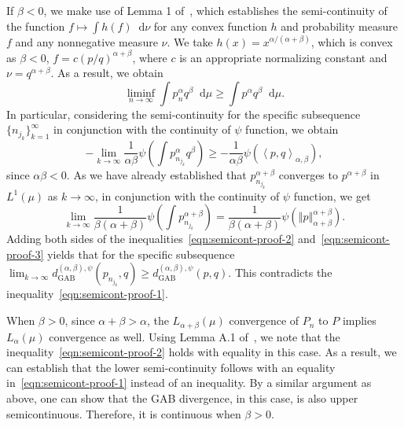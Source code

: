 \documentclass[11pt]{article}
\theoremstyle{plain}
\theoremstyle{remark}
\newcommand{\dd}{\mathop{}\!\mathrm{d}}
\newcommand{\dGAB}{d_{\mathrm{GAB}}}
\newcommand{\norm}[1]{\left\Vert #1 \right\Vert}
\newcommand{\inner}[1]{\left\langle #1\right\rangle}
\begin{document}
If $\beta < 0$, we make use of Lemma 1 of~\cite{teboulle1993convergence}, which establishes the semi-continuity of the function $f \mapsto \int h(f)\dd\nu$ for any convex function $h$ and probability measure $f$ and any nonnegative measure $\nu$. We take $h(x) = x^{\alpha/(\alpha+\beta)}$, which is convex as $\beta < 0$, $f = c(p/q)^{\alpha+\beta}$, where $c$ is an appropriate normalizing constant and $\nu = q^{\alpha+\beta}$. As a result, we obtain
\begin{equation*}
    \liminf_{n\rightarrow \infty} \int p_n^{\alpha} q^\beta \dd\mu \geq \int p^\alpha q^\beta \dd\mu.
\end{equation*}
\noindent In particular, considering the semi-continuity for the specific subsequence $\{ n_{j_k} \}_{k=1}^\infty$ in conjunction with the continuity of $\psi$ function, we obtain
\begin{equation}
    -\lim_{k \rightarrow \infty} \dfrac{1}{\alpha\beta} \psi\left( \int p_{n_{j_k}}^\alpha q^\beta \right) \geq -\dfrac{1}{\alpha\beta}\psi\left( \inner{p, q}_{\alpha,\beta} \right),
    \label{eqn:semicont-proof-2}
\end{equation}
\noindent since $\alpha\beta < 0$. As we have already established that $p_{n_{j_k}}^{\alpha+\beta}$ converges to $p^{\alpha+\beta}$ in $L^1(\mu)$ as $k \rightarrow \infty$, in conjunction with the continuity of $\psi$ function, we get
\begin{equation}
    \lim_{k \rightarrow \infty} \dfrac{1}{\beta(\alpha+\beta)} \psi\left( \int p_{n_{j_k}}^{\alpha+\beta} \right) = \dfrac{1}{\beta(\alpha+\beta)} \psi(\norm{p}_{\alpha+\beta}^{\alpha+\beta}).
    \label{eqn:semicont-proof-3}
\end{equation}
\noindent Adding both sides of the inequalities~\eqref{eqn:semicont-proof-2} and~\eqref{eqn:semicont-proof-3} yields that for the specific subsequence $\lim_{k\rightarrow \infty} \dGAB^{(\alpha,\beta),\psi}(p_{n_{j_k}}, q) \geq \dGAB^{(\alpha,\beta),\psi}(p, q)$. This contradicts the inequality~\eqref{eqn:semicont-proof-1}.

When $\beta > 0$, since $\alpha+\beta > \alpha$, the $L_{\alpha+\beta}(\mu)$ convergence of $P_n$ to $P$ implies $L_\alpha(\mu)$ convergence as well. Using Lemma A.1 of~\cite{roy2026asymptotic}, we note that the inequality~\eqref{eqn:semicont-proof-2} holds with equality in this case. As a result, we can establish that the lower semi-continuity follows with an equality in~\eqref{eqn:semicont-proof-1} instead of an inequality. By a similar argument as above, one can show that the GAB divergence, in this case, is also upper semicontinuous. Therefore, it is continuous when $\beta > 0$.
\end{document}
